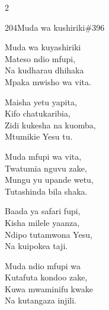 \begin{multicols}{2}
\begin{hymn}{204}{Muda wa kushiriki}{\#396}
\begin{stanza}
Muda wa kuyashiriki\\
Mateso ndio mfupi,\\
Na kudharau dhihaka\\
Mpaka mwisho wa vita.
\end{stanza}
\begin{chorus}
Maisha yetu yapita,\\
Kifo chatukaribia,\\
Zidi kukesha na kuomba,\\
Mtumikie Yesu tu.
\end{chorus}
\begin{stanza}
Muda mfupi wa vita,\\
Twatumia nguvu zake,\\
Mungu yu upande wetu,\\
Tutashinda bila shaka.
\end{stanza}
\begin{stanza}
Baada ya safari fupi,\\
Kisha milele yaanza,\\
Ndipo tutamwona Yesu,\\
Na kuipokea taji.
\end{stanza}
\begin{stanza}
Muda ndio mfupi wa\\
Kutafuta kondoo zake,\\
Kuwa mwaminifu kwake\\
Na kutangaza injili.
\end{stanza}
\end{hymn}


\end{multicols}
